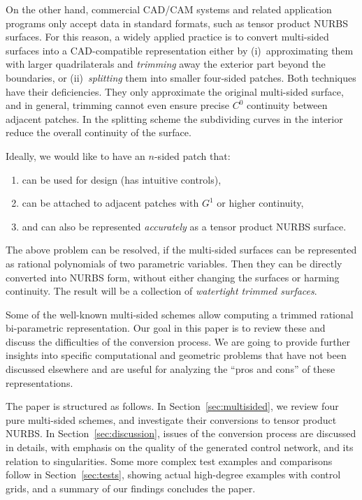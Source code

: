 \documentclass[9pt,academicons]{article}
\begin{document}
On the other hand, commercial CAD/CAM systems and related application programs only accept
data in standard formats, such as tensor product NURBS surfaces. For this reason, a
widely applied practice is to convert multi-sided surfaces into a CAD-compatible
representation either by (i)~approximating them with larger quadrilaterals and
\emph{trimming} away the exterior part beyond the boundaries, or (ii)~\emph{splitting}
them into smaller four-sided patches.
Both techniques have their deficiencies. They only approximate the original multi-sided
surface, and in general, trimming cannot even ensure precise $C^0$ continuity between
adjacent patches. In the splitting scheme the subdividing curves in the interior
reduce the overall continuity of the surface.

Ideally, we would like to have an $n$-sided patch that:
\begin{enumerate}[label=\roman*),leftmargin=3\parindent]
\item can be used for design (has intuitive controls),
\item can be attached to adjacent patches with $G^1$ or higher continuity,
\item and can also be represented \emph{accurately} as a tensor product NURBS surface.
\end{enumerate}

The above problem can be resolved, if the multi-sided surfaces can be represented as rational
polynomials of two parametric variables. Then they can be directly converted into
NURBS form, without either changing the surfaces or harming continuity. The result will be
a collection of \emph{watertight trimmed surfaces}.
 
Some of the well-known multi-sided schemes allow computing a trimmed rational bi-parametric
representation. Our goal in this paper is to review these and discuss the difficulties of
the conversion process. We are going to provide further insights into specific
computational and geometric problems that have not been discussed elsewhere and are
useful for analyzing the ``pros and cons'' of these representations.

The paper is structured as follows. In Section~\ref{sec:multisided},
we review four pure multi-sided schemes, and investigate their conversions to tensor product NURBS.
In Section~\ref{sec:discussion}, issues of the conversion process are discussed in details,
with emphasis on the quality of the generated control network, and its relation to singularities.
Some more complex test examples and comparisons follow in Section~\ref{sec:tests},
showing actual high-degree examples with control grids,
and a summary of our findings concludes the paper.
\end{document}
